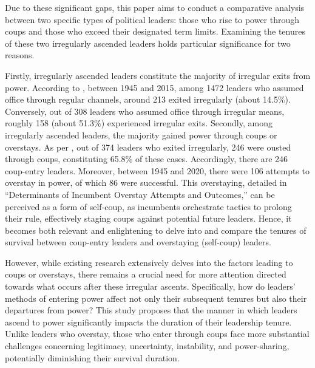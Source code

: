 \documentclass[
  12pt,
  a4paper,
  12pt]{article}
\begin{document}
Due to these significant gaps, this paper aims to conduct a comparative
analysis between two specific types of political leaders: those who rise
to power through coups and those who exceed their designated term
limits. Examining the tenures of these two irregularly ascended leaders
holds particular significance for two reasons.

Firstly, irregularly ascended leaders constitute the majority of
irregular exits from power. According to \citep{goemans2009}, between
1945 and 2015, among 1472 leaders who assumed office through regular
channels, around 213 exited irregularly (about 14.5\%). Conversely, out
of 308 leaders who assumed office through irregular means, roughly 158
(about 51.3\%) experienced irregular exits. Secondly, among irregularly
ascended leaders, the majority gained power through coups or overstays.
As per \citep{goemans2009}, out of 374 leaders who exited irregularly,
246 were ousted through coups, constituting 65.8\% of these cases.
Accordingly, there are 246 coup-entry leaders. Moreover, between 1945
and 2020, there were 106 attempts to overstay in power, of which 86 were
successful. This overstaying, detailed in ``Determinants of Incumbent
Overstay Attempts and Outcomes,'' can be perceived as a form of
self-coup, as incumbents orchestrate tactics to prolong their rule,
effectively staging coups against potential future leaders. Hence, it
becomes both relevant and enlightening to delve into and compare the
tenures of survival between coup-entry leaders and overstaying
(self-coup) leaders.

However, while existing research extensively delves into the factors
leading to coups or overstays, there remains a crucial need for more
attention directed towards what occurs after these irregular ascents.
Specifically, how do leaders' methods of entering power affect not only
their subsequent tenures but also their departures from power? This
study proposes that the manner in which leaders ascend to power
significantly impacts the duration of their leadership tenure. Unlike
leaders who overstay, those who enter through coups face more
substantial challenges concerning legitimacy, uncertainty, instability,
and power-sharing, potentially diminishing their survival duration.
\end{document}
